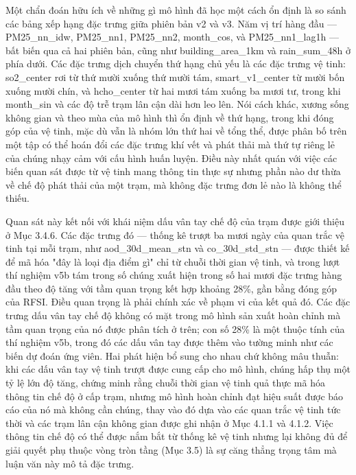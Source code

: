 Một chẩn đoán hữu ích về những gì mô hình đã học một cách ổn định là so sánh các bảng xếp hạng đặc trưng giữa phiên bản v2 và v3. Năm vị trí hàng đầu --- PM25\_nn\_idw, PM25\_nn1, PM25\_nn2, month\_cos, và PM25\_nn1\_lag1h --- bất biến qua cả hai phiên bản, cũng như building\_area\_1km và rain\_sum\_48h ở phía dưới. Các đặc trưng dịch chuyển thứ hạng chủ yếu là các đặc trưng vệ tinh: so2\_center rơi từ thứ mười xuống thứ mười tám, smart\_v1\_center từ mười bốn xuống mười chín, và hcho\_center từ hai mươi tám xuống ba mươi tư, trong khi month\_sin và các độ trễ trạm lân cận dài hơn leo lên. Nói cách khác, xương sống không gian và theo mùa của mô hình thì ổn định về thứ hạng, trong khi đóng góp của vệ tinh, mặc dù vẫn là nhóm lớn thứ hai về tổng thể, được phân bố trên một tập có thể hoán đổi các đặc trưng khí vết và phát thải mà thứ tự riêng lẻ của chúng nhạy cảm với cấu hình huấn luyện. Điều này nhất quán với việc các biến quan sát được từ vệ tinh mang thông tin thực sự nhưng phần nào dư thừa về chế độ phát thải của một trạm, mà không đặc trưng đơn lẻ nào là không thể thiếu.

Quan sát này kết nối với khái niệm dấu vân tay chế độ của trạm được giới thiệu ở Mục 3.4.6. Các đặc trưng đó --- thống kê trượt ba mươi ngày của quan trắc vệ tinh tại mỗi trạm, như aod\_30d\_mean\_stn và co\_30d\_std\_stn --- được thiết kế để mã hóa "đây là loại địa điểm gì" chỉ từ chuỗi thời gian vệ tinh, và trong lượt thí nghiệm v5b tám trong số chúng xuất hiện trong số hai mươi đặc trưng hàng đầu theo độ tăng với tầm quan trọng kết hợp khoảng 28\%, gần bằng đóng góp của RFSI. Điều quan trọng là phải chính xác về phạm vi của kết quả đó. Các đặc trưng dấu vân tay chế độ không có mặt trong mô hình sản xuất hoàn chỉnh mà tầm quan trọng của nó được phân tích ở trên; con số 28\% là một thuộc tính của thí nghiệm v5b, trong đó các dấu vân tay được thêm vào tường minh như các biến dự đoán ứng viên. Hai phát hiện bổ sung cho nhau chứ không mâu thuẫn: khi các dấu vân tay vệ tinh trượt được cung cấp cho mô hình, chúng hấp thụ một tỷ lệ lớn độ tăng, chứng minh rằng chuỗi thời gian vệ tinh quả thực mã hóa thông tin chế độ ở cấp trạm, nhưng mô hình hoàn chỉnh đạt hiệu suất được báo cáo của nó mà không cần chúng, thay vào đó dựa vào các quan trắc vệ tinh tức thời và các trạm lân cận không gian được ghi nhận ở Mục 4.1.1 và 4.1.2. Việc thông tin chế độ có thể được nắm bắt từ thống kê vệ tinh nhưng lại không đủ để giải quyết phụ thuộc vòng tròn tầng (Mục 3.5) là sự căng thẳng trọng tâm mà luận văn này mô tả đặc trưng.

